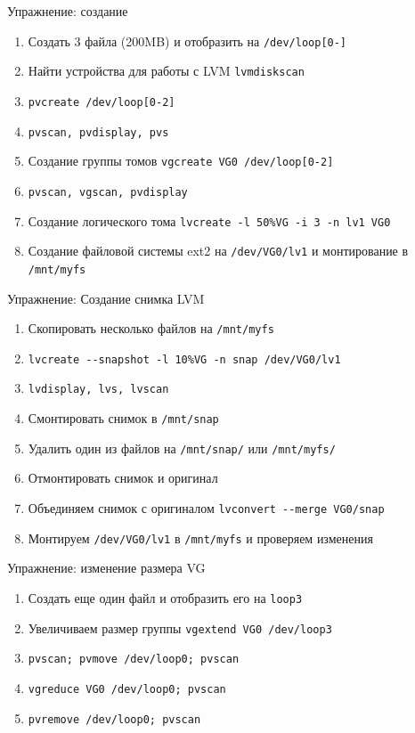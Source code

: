 \begin{frame}{Упражнение: создание}
  \begin{enumerate}
    \item Создать 3 файла (200MB) и отобразить на {\tt /dev/loop[0-]}
	\item Найти устройства для работы с LVM {\tt lvmdiskscan}
	\item  {\tt pvcreate /dev/loop[0-2]}
    \item  {\tt pvscan, pvdisplay, pvs}
		\pause
    \item Создание группы томов {\tt vgcreate VG0 /dev/loop[0-2]}
    \item {\tt pvscan, vgscan, pvdisplay}
		\pause
    \item Создание логического тома {\tt lvcreate  -l 50\%VG -i 3 -n lv1 VG0}
	\item Создание файловой системы ext2 на {\tt /dev/VG0/lv1} и монтирование в {\tt /mnt/myfs}
	\end{enumerate}
\end{frame}


\begin{frame}{Упражнение: Создание снимка LVM}
  \begin{enumerate}
    \item Скопировать несколько файлов на { \tt /mnt/myfs}
    \item  {\tt lvcreate -\phantom{}-snapshot -l 10\%VG -n snap /dev/VG0/lv1}
    \item  {\tt lvdisplay, lvs, lvscan}
	\item Смонтировать снимок в {\tt /mnt/snap}
		\pause
    \item Удалить один из файлов на {\tt /mnt/snap/} или {\tt /mnt/myfs/}
	\item Отмонтировать снимок и оригинал
		\pause
	\item Объединяем снимок с оригиналом {\tt lvconvert -\phantom{}-merge VG0/snap}
	\item Монтируем {\tt /dev/VG0/lv1} в {\tt /mnt/myfs} и проверяем изменения
  \end{enumerate}
\end{frame}

\begin{frame}{Упражнение: изменение размера VG}
  \begin{enumerate}
	\item Создать еще один файл и отобразить его на {\tt loop3}
	\item Увеличиваем размер группы {\tt vgextend VG0 /dev/loop3}
		\pause
    \item  {\tt pvscan; pvmove /dev/loop0; pvscan}
    \item  {\tt vgreduce VG0 /dev/loop0; pvscan}
    \item  {\tt pvremove /dev/loop0; pvscan}
  \end{enumerate}
\end{frame}


